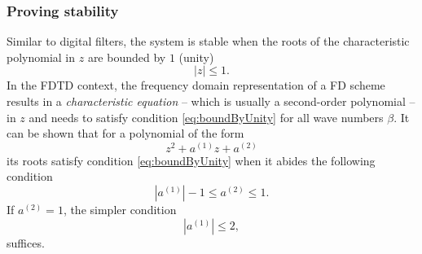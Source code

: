 {{\subsubsection{Proving stability}
Similar to digital filters, the system is stable when the roots of the characteristic polynomial in $z$ are bounded by $1$ (unity)
\begin{equation}\label{eq:boundByUnity}
    |z| \leq 1.
\end{equation} 
In the FDTD context, the frequency domain representation of a FD scheme results in a \textit{characteristic equation} -- which is usually a second-order polynomial -- in $z$ and needs to satisfy condition \eqref{eq:boundByUnity} for all wave numbers $\beta$.
It can be shown that for a polynomial of the form 
\begin{equation}\label{eq:polynomialForm}
    z^2 + a^{(1)}z + a^{(2)}
\end{equation} 
its roots satisfy condition \eqref{eq:boundByUnity} when it abides the following condition \cite{theBible}
\begin{equation}\label{eq:condition214}
    |a^{(1)}| - 1 \leq a^{(2)} \leq 1.
\end{equation}
If $a^{(2)} = 1$, the simpler condition
\begin{equation}\label{eq:simplerCondition215}
    |a^{(1)}|\leq 2,
\end{equation}
suffices. 

}}
